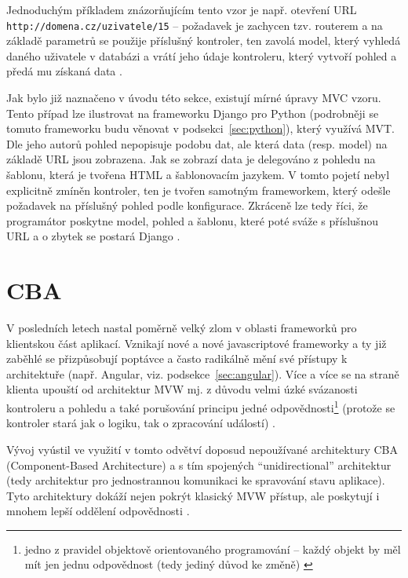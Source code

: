     Jednoduchým příkladem znázorňujícím tento vzor je např. otevření URL \verb|http://domena.cz/uzivatele/15| -- požadavek je zachycen tzv. routerem a na základě parametrů se použije příslušný kontroler, ten zavolá model, který vyhledá daného uživatele v databázi a vrátí jeho údaje kontroleru, který vytvoří pohled a předá mu získaná data \cite{mvc-cz1}.
    
    Jak bylo již naznačeno v úvodu této sekce, existují mírné úpravy MVC vzoru. Tento případ lze ilustrovat na frameworku Django pro Python (podrobněji se tomuto frameworku budu věnovat v podsekci~\ref{sec:python}), který využívá MVT. Dle jeho autorů \cite{django-docs-mvp} pohled nepopisuje podobu dat, ale která data (resp. model) na základě URL jsou zobrazena. Jak se zobrazí data je delegováno z pohledu na šablonu, která je tvořena HTML a šablonovacím jazykem. V tomto pojetí nebyl explicitně zmíněn kontroler, ten je tvořen samotným frameworkem, který odešle požadavek na příslušný pohled podle konfigurace. Zkráceně lze tedy říci, že programátor poskytne model, pohled a šablonu, které poté sváže s příslušnou URL a o zbytek se postará Django \cite{django-mvp2}.
    
    \section{CBA}\label{cba}
    V posledních letech nastal poměrně velký zlom v oblasti frameworků pro klientskou část aplikací. Vznikají nové a nové javascriptové frameworky a ty již zaběhlé se přizpůsobují poptávce a často radikálně mění své přístupy k architektuře (např. Angular, viz. podsekce~\ref{sec:angular}). Více a více se na straně klienta upouští od architektur MVW mj. z důvodu velmi úzké svázanosti kontroleru a pohledu a také porušování principu jedné odpovědnosti\footnote{jedno z pravidel objektově orientovaného programování -- každý objekt by měl mít jen jednu odpovědnost (tedy jediný důvod ke změně) \cite{single-responsibility}} (protože se kontroler stará jak o logiku, tak o zpracování událostí) \cite{mvc-frontend}.
    
    Vývoj vyústil ve využití v tomto odvětví doposud nepoužívané architektury CBA (Component-Based Architecture) a s tím spojených  \enquote{unidirectional} architektur (tedy architektur pro jednostrannou komunikaci ke spravování stavu aplikace). Tyto architektury dokáží nejen pokrýt klasický MVW přístup, ale poskytují i mnohem lepší oddělení odpovědnosti \cite{mvc-frontend}.
    
